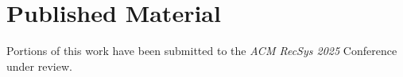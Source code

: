 \section{Published Material}
Portions of this work have been submitted to the \emph{ACM RecSys 2025} Conference under review.


